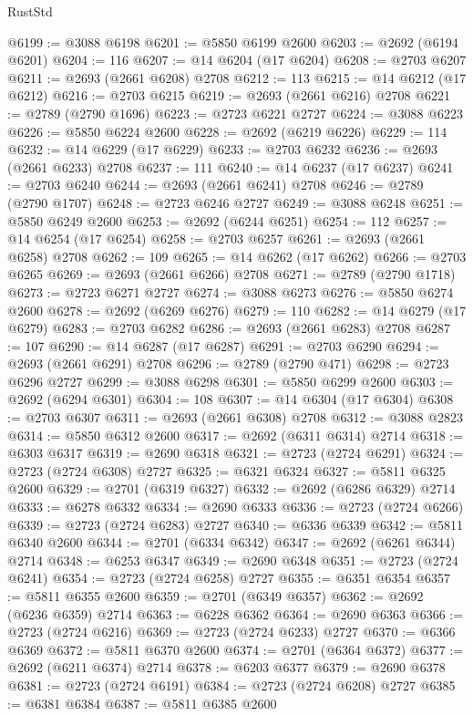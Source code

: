 \begin{lexlean}{RustStd}
\begin{coremodule}
@6199 := @3088 @6198
@6201 := @5850 @6199 @2600
@6203 := @2692 (@6194 @6201)
@6204 := 116
@6207 := @14 @6204 (@17 @6204)
@6208 := @2703 @6207
@6211 := @2693 (@2661 @6208) @2708
@6212 := 113
@6215 := @14 @6212 (@17 @6212)
@6216 := @2703 @6215
@6219 := @2693 (@2661 @6216) @2708
@6221 := @2789 (@2790 @1696)
@6223 := @2723 @6221 @2727
@6224 := @3088 @6223
@6226 := @5850 @6224 @2600
@6228 := @2692 (@6219 @6226)
@6229 := 114
@6232 := @14 @6229 (@17 @6229)
@6233 := @2703 @6232
@6236 := @2693 (@2661 @6233) @2708
@6237 := 111
@6240 := @14 @6237 (@17 @6237)
@6241 := @2703 @6240
@6244 := @2693 (@2661 @6241) @2708
@6246 := @2789 (@2790 @1707)
@6248 := @2723 @6246 @2727
@6249 := @3088 @6248
@6251 := @5850 @6249 @2600
@6253 := @2692 (@6244 @6251)
@6254 := 112
@6257 := @14 @6254 (@17 @6254)
@6258 := @2703 @6257
@6261 := @2693 (@2661 @6258) @2708
@6262 := 109
@6265 := @14 @6262 (@17 @6262)
@6266 := @2703 @6265
@6269 := @2693 (@2661 @6266) @2708
@6271 := @2789 (@2790 @1718)
@6273 := @2723 @6271 @2727
@6274 := @3088 @6273
@6276 := @5850 @6274 @2600
@6278 := @2692 (@6269 @6276)
@6279 := 110
@6282 := @14 @6279 (@17 @6279)
@6283 := @2703 @6282
@6286 := @2693 (@2661 @6283) @2708
@6287 := 107
@6290 := @14 @6287 (@17 @6287)
@6291 := @2703 @6290
@6294 := @2693 (@2661 @6291) @2708
@6296 := @2789 (@2790 @471)
@6298 := @2723 @6296 @2727
@6299 := @3088 @6298
@6301 := @5850 @6299 @2600
@6303 := @2692 (@6294 @6301)
@6304 := 108
@6307 := @14 @6304 (@17 @6304)
@6308 := @2703 @6307
@6311 := @2693 (@2661 @6308) @2708
@6312 := @3088 @2823
@6314 := @5850 @6312 @2600
@6317 := @2692 (@6311 @6314) @2714
@6318 := @6303 @6317
@6319 := @2690 @6318
@6321 := @2723 (@2724 @6291)
@6324 := @2723 (@2724 @6308) @2727
@6325 := @6321 @6324
@6327 := @5811 @6325 @2600
@6329 := @2701 (@6319 @6327)
@6332 := @2692 (@6286 @6329) @2714
@6333 := @6278 @6332
@6334 := @2690 @6333
@6336 := @2723 (@2724 @6266)
@6339 := @2723 (@2724 @6283) @2727
@6340 := @6336 @6339
@6342 := @5811 @6340 @2600
@6344 := @2701 (@6334 @6342)
@6347 := @2692 (@6261 @6344) @2714
@6348 := @6253 @6347
@6349 := @2690 @6348
@6351 := @2723 (@2724 @6241)
@6354 := @2723 (@2724 @6258) @2727
@6355 := @6351 @6354
@6357 := @5811 @6355 @2600
@6359 := @2701 (@6349 @6357)
@6362 := @2692 (@6236 @6359) @2714
@6363 := @6228 @6362
@6364 := @2690 @6363
@6366 := @2723 (@2724 @6216)
@6369 := @2723 (@2724 @6233) @2727
@6370 := @6366 @6369
@6372 := @5811 @6370 @2600
@6374 := @2701 (@6364 @6372)
@6377 := @2692 (@6211 @6374) @2714
@6378 := @6203 @6377
@6379 := @2690 @6378
@6381 := @2723 (@2724 @6191)
@6384 := @2723 (@2724 @6208) @2727
@6385 := @6381 @6384
@6387 := @5811 @6385 @2600

\end{coremodule}
\end{lexlean}
